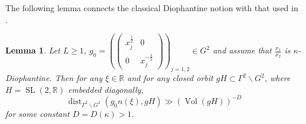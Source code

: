 \documentclass[12pt]{amsart}
\newtheorem{lem}[thm]{Lemma}
\theoremstyle{definition}
\theoremstyle{remark}
\numberwithin{equation}{section}
\newcommand{\R}{\mathbb{R}}
\begin{document}
The following lemma connects the classical Diophantine notion with that used in \cite[Theorem~1]{LMW2023a}.
\begin{lem}\label{lem:periodicorbits}
    Let $L \geq 1$, $g_0=\left(\left(\begin{matrix}
        x_j^{\frac{1}{2}} & 0 \\ 0 & x_j^{-\frac{1}{2}}
    \end{matrix}\right)\right)_{\!\!j=1,2}\in G^2$ and assume that $\frac{x_1}{x_2}$ is $\kappa$-Diophantine.
Then for any $\xi\in \R$ and for any closed orbit $gH\subset  \Gamma^2\backslash G^2$, where $H=\operatorname{SL}(2, \mathbb{R})$ embedded diagonally,
    $$\operatorname{dist}_{\Gamma^2 \backslash G^2}( g_0n(\xi), gH)\gg (\operatorname{Vol}(gH))^{-D}$$
    for some constant $D = D(\kappa) >1$.
\end{lem}
\end{document}
